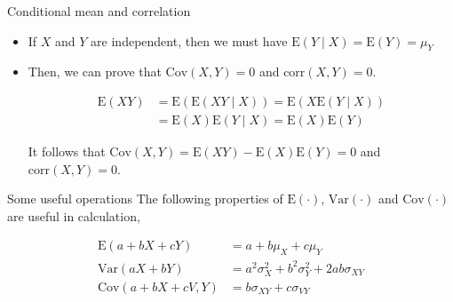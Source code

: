 \documentclass[presentation]{beamer}
\begin{document}
\begin{frame}[label={sec:org74da8c6}]{Conditional mean and correlation}
\begin{itemize}
\item If \(X\) and \(Y\) are independent, then we must have 
\(\mathrm{E}(Y \mid X) = \mathrm{E}(Y) = \mu_Y\)

\item Then, we can prove that
\(\mathrm{Cov}(X, Y) = 0\) and \(\mathrm{corr}(X, Y)=0\).

\begin{align*}
\mathrm{E}(XY) & = \mathrm{E}(\mathrm{E}(XY \mid X)) = \mathrm{E}(X \mathrm{E}(Y \mid X)) \\
               & = \mathrm{E}(X) \mathrm{E}(Y \mid X) = \mathrm{E}(X) \mathrm{E}(Y)
\end{align*}

It follows that \(\mathrm{Cov}(X,Y) = \mathrm{E}(XY) - \mathrm{E}(X)
   \mathrm{E}(Y) = 0\) and \(\mathrm{corr}(X, Y)=0\).
\end{itemize}
\end{frame}

\begin{frame}[label={sec:org19713f5}]{Some useful operations}
The following properties
of \(\mathrm{E}(\cdot)\), \(\mathrm{Var}(\cdot)\) and
\(\mathrm{Cov}(\cdot)\) are useful in calculation,

\begin{align*}
\mathrm{E}(a + bX + cY)      & = a + b \mu_{X} + c \mu_{Y} \\
\mathrm{Var}(aX + bY)        & = a^{2} \sigma^{2}_{X} + b^{2} \sigma^{2}_{Y} + 2ab\sigma_{XY} \\
\mathrm{Cov}(a + bX + cV, Y) & = b\sigma_{XY} + c\sigma_{VY} \\
\end{align*}
\end{frame}
\end{document}
